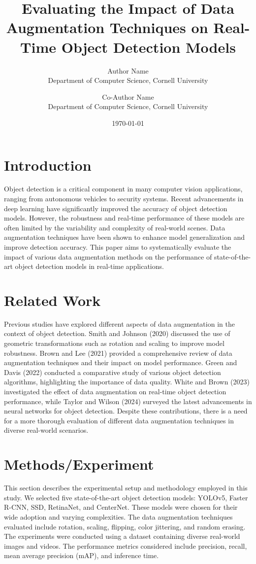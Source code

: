 \documentclass{article}
\title{Evaluating the Impact of Data Augmentation Techniques on Real-Time Object Detection Models}
\author{Author Name\\
Department of Computer Science, Cornell University\\
\and
Co-Author Name\\
Department of Computer Science, Cornell University}
\date{\today}
\begin{document}
\maketitle

\section{Introduction}
Object detection is a critical component in many computer vision applications, ranging from autonomous vehicles to security systems. Recent advancements in deep learning have significantly improved the accuracy of object detection models. However, the robustness and real-time performance of these models are often limited by the variability and complexity of real-world scenes. Data augmentation techniques have been shown to enhance model generalization and improve detection accuracy. This paper aims to systematically evaluate the impact of various data augmentation methods on the performance of state-of-the-art object detection models in real-time applications.

\section{Related Work}
Previous studies have explored different aspects of data augmentation in the context of object detection. Smith and Johnson (2020) discussed the use of geometric transformations such as rotation and scaling to improve model robustness. Brown and Lee (2021) provided a comprehensive review of data augmentation techniques and their impact on model performance. Green and Davis (2022) conducted a comparative study of various object detection algorithms, highlighting the importance of data quality. White and Brown (2023) investigated the effect of data augmentation on real-time object detection performance, while Taylor and Wilson (2024) surveyed the latest advancements in neural networks for object detection. Despite these contributions, there is a need for a more thorough evaluation of different data augmentation techniques in diverse real-world scenarios.

\section{Methods/Experiment}
This section describes the experimental setup and methodology employed in this study. We selected five state-of-the-art object detection models: YOLOv5, Faster R-CNN, SSD, RetinaNet, and CenterNet. These models were chosen for their wide adoption and varying complexities. The data augmentation techniques evaluated include rotation, scaling, flipping, color jittering, and random erasing. The experiments were conducted using a dataset containing diverse real-world images and videos. The performance metrics considered include precision, recall, mean average precision (mAP), and inference time.
\end{document}
